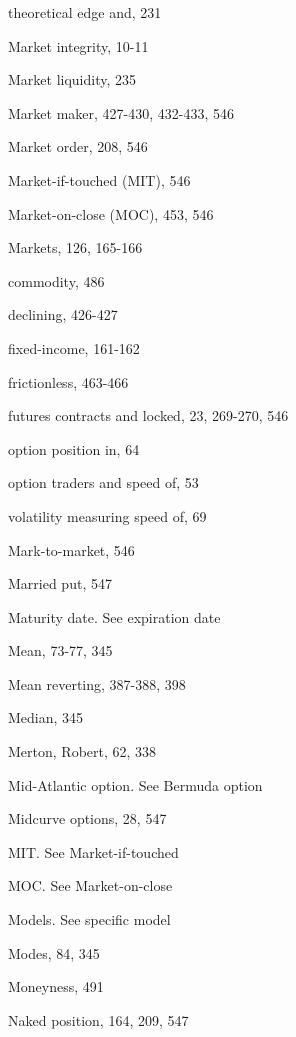 \noindent theoretical edge and, 231\par
\noindent Market integrity, 10-11\par
\noindent Market liquidity, 235\par
\noindent Market maker, 427-430, 432-433, 546\par
\noindent Market order, 208, 546\par
\noindent Market-if-touched (MIT), 546\par
\noindent Market-on-close (MOC), 453, 546\par
\noindent Markets, 126, 165-166\par
\noindent commodity, 486\par
\noindent declining, 426-427\par
\noindent fixed-income, 161-162\par
\noindent frictionless, 463-466\par
\noindent futures contracts and locked, 23, 269-270, 546\par
\noindent option position in, 64\par
\noindent option traders and speed of, 53\par
\noindent volatility measuring speed of, 69\par
\noindent Mark-to-market, 546\par
\noindent Married put, 547\par
\noindent Maturity date. See expiration date\par
\noindent Mean, 73-77, 345\par
\noindent Mean reverting, 387-388, 398\par
\noindent Median, 345\par
\noindent Merton, Robert, 62, 338\par
\noindent Mid-Atlantic option. See Bermuda option\par
\noindent Midcurve options, 28, 547\par
\noindent MIT. See Market-if-touched\par
\noindent MOC. See Market-on-close\par
\noindent Models. See specific model\par
\noindent Modes, 84, 345\par
\noindent Moneyness, 491\par
\noindent Naked position, 164, 209, 547\par

